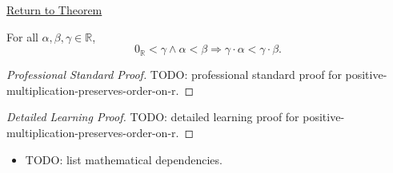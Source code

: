 \newpage
{}
\label{prf:positive-multiplication-preserves-order-on-r}

\begin{remark*}[Return]
\hyperref[thm:positive-multiplication-preserves-order-on-r]{Return to Theorem}
\end{remark*}

\begin{theorem*}
For all $\alpha,\beta,\gamma\in\mathbb{R}$,
\[
0_{\mathbb{R}}<\gamma\land\alpha<\beta
\Longrightarrow
\gamma\cdot\alpha<\gamma\cdot\beta.
\]
\end{theorem*}

\begin{proof}[Professional Standard Proof]
\LRAProofBodyStart
TODO: professional standard proof for positive-multiplication-preserves-order-on-r.
\end{proof}

\begin{proof}[Detailed Learning Proof]
\LRAProofBodyStart
TODO: detailed learning proof for positive-multiplication-preserves-order-on-r.
\end{proof}

\begin{remark*}
\end{remark*}

\begin{dependencies}
\begin{itemize}
  \item TODO: list mathematical dependencies.
\end{itemize}
\end{dependencies}

\clearpage
